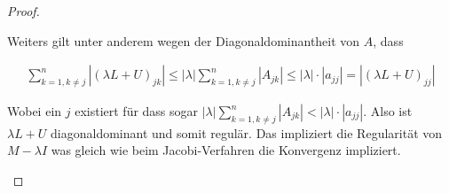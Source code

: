 \documentclass[]{article}
\begin{document}
\begin{proof}
\begin{enumerate}
	Weiters gilt unter anderem wegen der Diagonaldominantheit von $A$, dass
	
	\begin{align*}
		\sum_{k=1,k\neq j}^{n} |(\lambda L + U)_{jk}| \leq |\lambda| \sum_{k=1,k\neq j}^{n} |A_{jk}| \leq |\lambda|\cdot |a_{jj}| = |(\lambda L + U)_{jj}|
	\end{align*}

	Wobei ein $j$ existiert für dass sogar $|\lambda| \sum_{k=1,k\neq j}^{n} |A_{jk}| < |\lambda|\cdot |a_{jj}|$. Also ist $\lambda L + U$ diagonaldominant und somit regulär. Das impliziert die Regularität von $M-\lambda I$ was gleich wie beim Jacobi-Verfahren die Konvergenz impliziert.
	
	
	
	\end{enumerate}
\end{proof}
\end{document}
